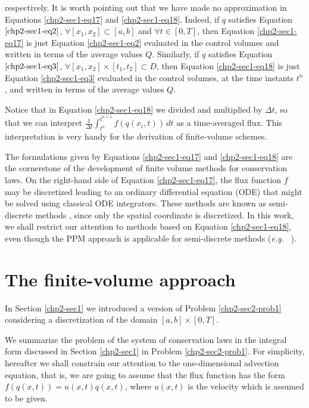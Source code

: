 respectively.
It is worth pointing out that we have made no approximation in Equations
\eqref{chp2-sec1-eq17} and \eqref{chp2-sec1-eq18}. Indeed, if ${q}$ satisfies Equation
$\eqref{chp2-sec1-eq2}$, $\forall [x_1, x_2] \subset [a,b]$ and $\forall t \in [0,T]$,
then Equation \eqref{chp2-sec1-eq17} is just Equation
\eqref{chp2-sec1-eq2} evaluated in the control volumes and written
in terms of the average values ${Q}$. 
Similarly, if ${q}$ satisfies Equation
$\eqref{chp2-sec1-eq3}$, $\forall [x_1, x_2] \times [t_1, t_2] \subset D$,
then Equation \eqref{chp2-sec1-eq18} is just Equation
\eqref{chp2-sec1-eq3} evaluated in the control volumes,
at the time instants $t^{n}$, and written
in terms of the average values ${Q}$.

Notice that in Equation \eqref{chp2-sec1-eq18} we divided and multiplied by $\Delta t$, so that 
we can interpret $\frac{1}{\Delta t}\int_{t^{n}}^{t^{n+1}}
{f}({q}(x_{i}, t)) \,dt $ as a time-averaged flux.
This interpretation is very handy for the derivation of finite-volume schemes.

The formulations given by Equations \eqref{chp2-sec1-eq17} and \eqref{chp2-sec1-eq18} are the cornerstone 
of the development of finite volume methods for conservation laws. 
On the right-hand side of Equation \eqref{chp2-sec1-eq17}, the flux function ${f}$ 
may be discretized leading to an ordinary differential equation (ODE)
that might be solved using classical ODE integrators.
These methods are known as semi-discrete methods \citep{leveque:2002}, since only the spatial coordinate is discretized.
In this work, we shall restrict our attention to methods based on Equation \eqref{chp2-sec1-eq18},
even though the PPM approach is applicable for semi-discrete methods (\textit{e.g.} \ \citet{suresh:1997}).

\section{The finite-volume approach}
\label{chp2-sec2}
In Section \ref{chp2-sec1} we introduced a version of Problem \ref{chp2-sec2-prob1}
considering a discretization of the domain $[a,b] \times [0,T]$. 



We summarize the problem of the system of conservation laws in the integral form 
discussed in Section \ref{chp2-sec1} in Problem \ref{chp2-sec2-prob1}.
For simplicity, hereafter we shall constrain our attention to the one-dimensional advection equation, 
that is, we are going to assume that the flux function has the form 
$f(q(x,t)) = u(x,t)q(x,t)$, where $u(x,t)$ is the velocity which is assumed to be given.

